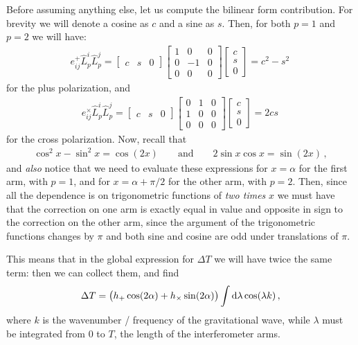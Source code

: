 \documentclass[main.tex]{subfiles}
\begin{document}
Before assuming anything else, let us compute the bilinear form contribution. For brevity we will denote a cosine as \(c\) and a sine as \(s\). Then, for both \(p =1\) and \(p=2\) we will have: 
%
\begin{align}
e_{ij}^{+} \hat{L}^{i}_{p} \hat{L}^{j}_p 
= \left[\begin{array}{ccc}
c & s & 0
\end{array}\right] 
\left[\begin{array}{ccc}
1 & 0 & 0 \\ 
0 & -1 & 0 \\ 
0 & 0 & 0
\end{array}\right] 
\left[\begin{array}{c}
c \\ 
s \\ 
0
\end{array}\right]= c^2- s^2 
\,
\end{align}
%
for the plus polarization, and 
%
\begin{align}
e_{ij}^{ \times } \hat{L}^{i}_{p} \hat{L}^{j}_p 
= \left[\begin{array}{ccc}
c & s & 0
\end{array}\right] 
\left[\begin{array}{ccc}
0 & 1 & 0 \\ 
1 & 0 & 0 \\ 
0 & 0 & 0
\end{array}\right] 
\left[\begin{array}{c}
c \\ 
s \\ 
0
\end{array}\right]= 2cs
\,
\end{align}
%
for the cross polarization. Now, recall that 
%
\begin{align}
\cos^2 x - \sin^2 x = \cos(2x) \qquad \text{and} \qquad
2 \sin x \cos x = \sin (2 x)
\,,
\end{align}
%
and \emph{also} notice that we need to evaluate these expressions for \(x = \alpha \) for the first arm, with \(p=1\), and for \(x = \alpha + \pi /2\) for the other arm, with \(p=2\). Then, since all the dependence is on trigonometric functions of \emph{two times} \(x\) we must have that the correction on one arm is exactly equal in value and opposite in sign to the correction on the other arm, since the argument of the trigonometric functions changes by \(\pi \) and both sine and cosine are odd under translations of \(\pi \).

This means that in the global expression for \(\Delta T\) we will have twice the same term: then we can collect them, and find 
%
\begin{align}
\Delta T = \qty(h_{+} \cos(2 \alpha ) + h_{ \times } \sin(2 \alpha )) \int \dd{\lambda } \cos(\lambda k)
\,,
\end{align}
%
where \(k\) is the wavenumber / frequency of the gravitational wave, while \(\lambda \) must be integrated from 0 to \(T\), the length of the interferometer arms. 
\end{document}

